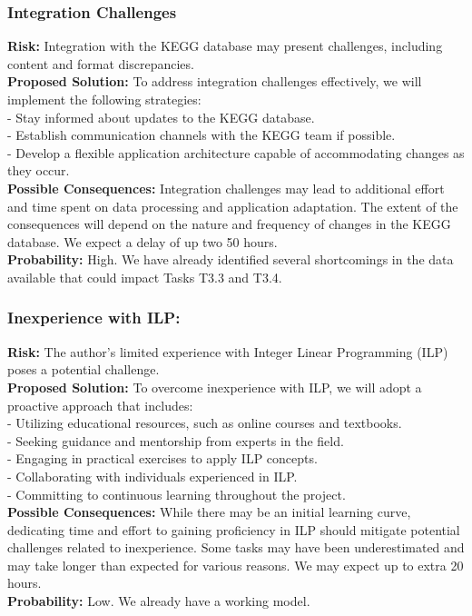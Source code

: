 \subsubsection{Integration Challenges}

\textbf{Risk:} Integration with the KEGG database may present challenges, including content and format discrepancies.\\
\textbf{Proposed Solution:} To address integration challenges effectively, we will implement the following strategies:\\
- Stay informed about updates to the KEGG database.\\
- Establish communication channels with the KEGG team if possible.\\
- Develop a flexible application architecture capable of accommodating changes as they occur.\\
\textbf{Possible Consequences:} Integration challenges may lead to additional effort and time spent on data processing and application adaptation. The extent of the consequences will depend on the nature and frequency of changes in the KEGG database. We expect a delay of up two 50 hours.\\
\textbf{Probability:} High. We have already identified several shortcomings in the data available that could impact Tasks T3.3 and T3.4.

\subsubsection{Inexperience with ILP:}

\textbf{Risk:} The author's limited experience with Integer Linear Programming (ILP) poses a potential challenge.\\
\textbf{Proposed Solution:} To overcome inexperience with ILP, we will adopt a proactive approach that includes:\\
    - Utilizing educational resources, such as online courses and textbooks.\\
    - Seeking guidance and mentorship from experts in the field.\\
    - Engaging in practical exercises to apply ILP concepts.\\
    - Collaborating with individuals experienced in ILP.\\
    - Committing to continuous learning throughout the project.\\
\textbf{Possible Consequences:} While there may be an initial learning curve, dedicating time and effort to gaining proficiency in ILP should mitigate potential challenges related to inexperience.
Some tasks may have been underestimated and may take longer than expected for various reasons. We may expect up to extra 20 hours.\\
\textbf{Probability:} Low. We already have a working model. 

